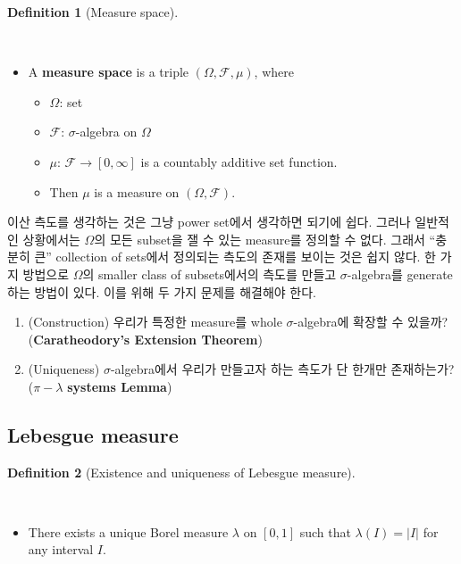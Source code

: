 \documentclass[
  letterpaper,
  DIV=11,
  numbers=noendperiod]{scrreprt}
\providecommand{\tightlist}{%
  \setlength{\itemsep}{0pt}\setlength{\parskip}{0pt}}
\theoremstyle{definition}
\theoremstyle{plain}
\theoremstyle{plain}
\theoremstyle{definition}
\theoremstyle{plain}
\theoremstyle{definition}
\newtheorem{definition}{Definition}[chapter]
\theoremstyle{remark}
\begin{document}
\begin{definition}[Measure
space]\protect\hypertarget{def-measurespace}{}\label{def-measurespace}

~

\begin{itemize}
\tightlist
\item
  A \textbf{measure space} is a triple \((\Omega, \mathcal{F}, \mu)\),
  where

  \begin{itemize}
  \tightlist
  \item
    \(\Omega\): set
  \item
    \(\mathcal{F}\): \(\sigma\)-algebra on \(\Omega\)
  \item
    \(\mu\): \(\mathcal{F} \rightarrow [0,\infty]\) is a countably
    additive set function.
  \item
    Then \(\mu\) is a measure on \((\Omega, \mathcal{F})\).
  \end{itemize}
\end{itemize}

\end{definition}

이산 측도를 생각하는 것은 그냥 power set에서 생각하면 되기에 쉽다.
그러나 일반적인 상황에서는 \(\Omega\)의 모든 subset을 잴 수 있는
measure를 정의할 수 없다. 그래서 ``충분히 큰'' collection of sets에서
정의되는 측도의 존재를 보이는 것은 쉽지 않다. 한 가지 방법으로
\(\Omega\)의 smaller class of subsets에서의 측도를 만들고
\(\sigma\)-algebra를 generate하는 방법이 있다. 이를 위해 두 가지 문제를
해결해야 한다.

\begin{enumerate}
\def\labelenumi{\arabic{enumi}.}
\item
  (Construction) 우리가 특정한 measure를 whole \(\sigma\)-algebra에
  확장할 수 있을까? (\textbf{Caratheodory's Extension Theorem})
\item
  (Uniqueness) \(\sigma\)-algebra에서 우리가 만들고자 하는 측도가 단
  한개만 존재하는가? (\(\pi-\lambda\) \textbf{systems Lemma})
\end{enumerate}

\subsection{Lebesgue measure}\label{lebesgue-measure}

\begin{definition}[Existence and uniqueness of Lebesgue
measure]\protect\hypertarget{def-existenceuniquenessLebesgue}{}\label{def-existenceuniquenessLebesgue}

~

\begin{itemize}
\tightlist
\item
  There exists a unique Borel measure \(\lambda\) on \([0,1]\) such that
  \(\lambda (I) = \vert I \vert\) for any interval \(I\).
\end{itemize}

\end{definition}
\end{document}

